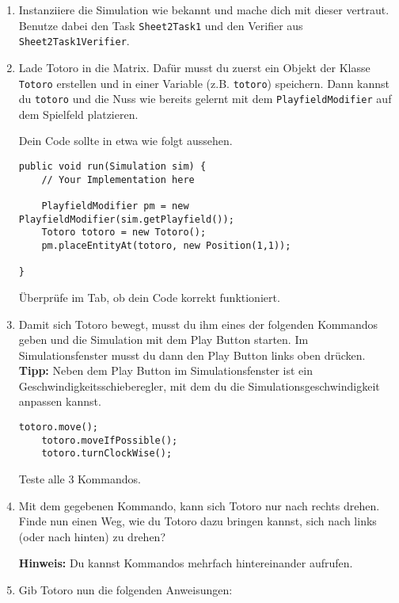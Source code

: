 \begin{enumerate}
    \item Instanziiere die Simulation wie bekannt und mache dich mit dieser vertraut. 
        Benutze dabei den Task \lstinline{Sheet2Task1} und den Verifier aus \lstinline{Sheet2Task1Verifier}.
    \item Lade Totoro in die Matrix.
        Dafür musst du zuerst ein Objekt der Klasse \lstinline{Totoro} erstellen und in einer Variable (z.B. \lstinline{totoro}) speichern.
        Dann kannst du \lstinline{totoro} und die Nuss wie bereits gelernt mit dem \lstinline{PlayfieldModifier} auf dem Spielfeld platzieren.

        Dein Code sollte in etwa wie folgt aussehen.

        \begin{lstlisting}[firstnumber=14]
public void run(Simulation sim) {
    // Your Implementation here

    PlayfieldModifier pm = new PlayfieldModifier(sim.getPlayfield());
    Totoro totoro = new Totoro();
    pm.placeEntityAt(totoro, new Position(1,1));

}
        \end{lstlisting}

        Überprüfe im  Tab, ob dein Code korrekt funktioniert.
        \item Damit sich Totoro bewegt, musst du ihm eines der folgenden Kommandos geben und die Simulation mit dem Play Button starten. 
        Im Simulationsfenster musst du dann den Play Button links oben drücken. \\
        \textbf{Tipp:} Neben dem Play Button im Simulationsfenster ist ein Geschwindigkeitsschieberegler, mit dem du die Simulationsgeschwindigkeit anpassen kannst.

        \begin{lstlisting}[firstnumber=20]
    totoro.move();
    totoro.moveIfPossible();
    totoro.turnClockWise();
        \end{lstlisting}

        Teste alle 3 Kommandos.\\
        \item Mit dem gegebenen Kommando, kann sich Totoro nur nach rechts drehen.\\
        Finde nun einen Weg, wie du Totoro dazu bringen kannst, sich nach links (oder nach hinten) zu drehen?
        
        \textbf{Hinweis:} Du kannst Kommandos mehrfach hintereinander aufrufen.
\newpage
        \item Gib Totoro nun die folgenden Anweisungen:
        

\end{enumerate}
